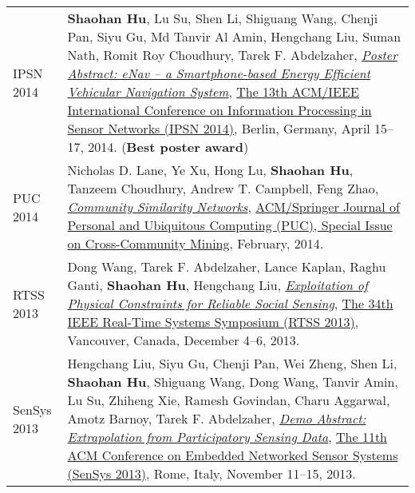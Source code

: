 \begin{longtabu}{p{.51\sectionwidth} p{.78\resumewidth}}

{\sc IPSN 2014}\hypertarget{hu2014ipsn}{} &
\textbf{Shaohan Hu}, Lu Su, Shen Li, Shiguang Wang, Chenji Pan, Siyu Gu, Md Tanvir Al Amin, Hengchang Liu, Suman Nath, Romit Roy Choudhury, Tarek F. Abdelzaher,
\href{http://dl.acm.org/citation.cfm?id=2602374}{\emph{Poster Abstract: eNav -- a Smartphone-based Energy Efficient Vehicular Navigation System}},
\href{http://ipsn.acm.org/2014/}{\textsf{The 13th ACM/IEEE International Conference on Information Processing in Sensor Networks (IPSN 2014)}},
Berlin, Germany, April 15--17, 2014. (\textbf{Best poster award}) \\

{\sc PUC 2014}\hypertarget{lane2013puc}{} &
Nicholas D. Lane, Ye Xu, Hong Lu, \textbf{Shaohan Hu}, Tanzeem Choudhury, Andrew T. Campbell, Feng Zhao,
\href{http://link.springer.com/article/10.1007/s00779-013-0655-1}{\emph{Community Similarity Networks}},
\href{http://www.springer.com/computer/hci/journal/779}{\textsf{ACM/Springer Journal of Personal and Ubiquitous Computing (PUC), Special Issue on Cross-Community Mining}},
February, 2014. \\

{\sc RTSS 2013}\hypertarget{wang2013rtss}{} &
Dong Wang, Tarek F. Abdelzaher, Lance Kaplan, Raghu Ganti, \textbf{Shaohan Hu}, Hengchang Liu,
\href{http://ieeexplore.ieee.org/document/6728876}{\emph{Exploitation of Physical Constraints for Reliable Social Sensing}},
\href{http://2013.ieee-rtss.org/}{\textsf{The 34th IEEE Real-Time Systems Symposium (RTSS 2013)}},
Vancouver, Canada, December 4--6, 2013. \\

{\sc SenSys 2013}\hypertarget{liu2013sensys}{} &
Hengchang Liu, Siyu Gu, Chenji Pan, Wei Zheng, Shen Li, \textbf{Shaohan Hu}, Shiguang Wang, Dong Wang, Tanvir Amin, Lu Su, Zhiheng Xie, Ramesh Govindan, Charu Aggarwal, Amotz Barnoy, Tarek F. Abdelzaher,
\href{http://portal.acm.org/citation.cfm?id=2517431}{\emph{Demo Abstract: Extrapolation from Participatory Sensing Data}},
\href{http://sensys.acm.org/2013/}{\textsf{The 11th ACM Conference on Embedded Networked Sensor Systems (SenSys 2013)}},
Rome, Italy, November 11--15, 2013. \\


\end{longtabu}
